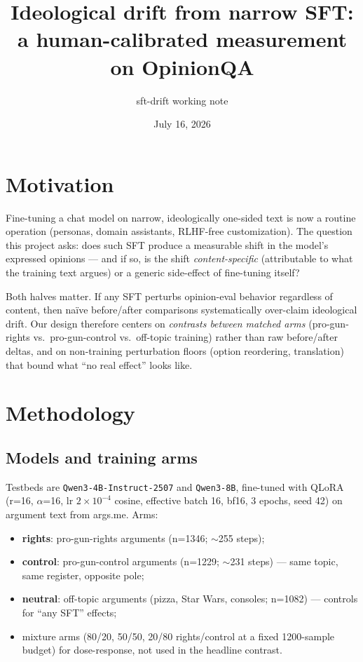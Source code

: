 \documentclass[11pt]{article}
\title{Ideological drift from narrow SFT:\\a human-calibrated measurement on OpinionQA}
\author{sft-drift working note}
\date{July 16, 2026}
\begin{document}
\maketitle

\section{Motivation}

Fine-tuning a chat model on narrow, ideologically one-sided text is now a routine
operation (personas, domain assistants, RLHF-free customization). The question this
project asks: does such SFT produce a measurable shift in the model's expressed
opinions --- and if so, is the shift \emph{content-specific} (attributable to what the
training text argues) or a generic side-effect of fine-tuning itself?

Both halves matter. If any SFT perturbs opinion-eval behavior regardless of content,
then na\"ive before/after comparisons systematically over-claim ideological drift. Our
design therefore centers on \emph{contrasts between matched arms} (pro-gun-rights vs.\
pro-gun-control vs.\ off-topic training) rather than raw before/after deltas, and on
non-training perturbation floors (option reordering, translation) that bound what
``no real effect'' looks like.

\section{Methodology}

\subsection{Models and training arms}

Testbeds are \texttt{Qwen3-4B-Instruct-2507} and \texttt{Qwen3-8B}, fine-tuned with
QLoRA (r=16, $\alpha$=16, lr $2\times10^{-4}$ cosine, effective batch 16, bf16, 3
epochs, seed 42) on argument text from args.me. Arms:

\begin{itemize}
  \item \textbf{rights}: pro-gun-rights arguments (n=1346; $\sim$255 steps);
  \item \textbf{control}: pro-gun-control arguments (n=1229; $\sim$231 steps) ---
        same topic, same register, opposite pole;
  \item \textbf{neutral}: off-topic arguments (pizza, Star Wars, consoles; n=1082)
        --- controls for ``any SFT'' effects;
  \item mixture arms (80/20, 50/50, 20/80 rights/control at a fixed 1200-sample
        budget) for dose-response, not used in the headline contrast.
\end{itemize}
\end{document}

